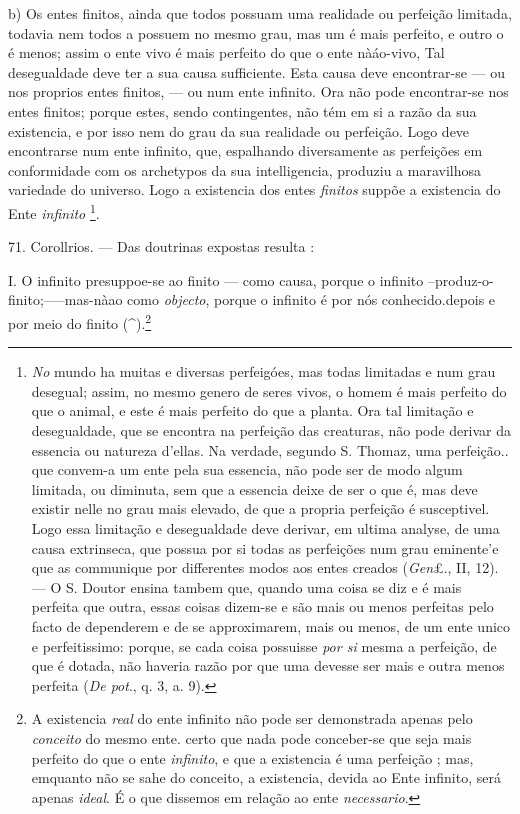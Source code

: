  b) Os entes finitos, ainda que todos possuam uma realidade ou perfeição limitada, todavia nem todos a possuem no mesmo grau, mas um é mais perfeito, e outro o é menos; assim o ente vivo é mais perfeito do que o ente nàáo-vivo, Tal desegualdade deve ter a sua causa sufficiente. Esta causa deve encontrar-se --- ou nos proprios entes finitos, --- ou num ente infinito. Ora não pode encontrar-se nos entes finitos; porque estes, sendo contingentes, não tém em si a razão da sua existencia, e por isso nem do grau da sua realidade ou perfeição. Logo deve encontrarse num ente infinito, que, espalhando diversamente as perfeições em conformidade com os archetypos da sua intelligencia, produziu a maravilhosa variedade do universo. Logo a existencia dos entes \emph{finitos} suppõe a existencia do Ente \emph{infinito} \footnote{\emph{No} mundo ha muitas e diversas perfeigóes, mas todas limitadas e num grau desegual; assim, no mesmo genero de seres vivos, o homem é mais perfeito do que o animal, e este é mais perfeito do que a planta. Ora tal limitação e desegualdade, que se encontra na perfeição das creaturas, não pode derivar da essencia ou natureza d'ellas. Na verdade, segundo S. Thomaz, uma perfeição.. que convem-a um ente pela sua essencia, não pode ser de modo algum limitada, ou diminuta, sem que a essencia deixe de ser o que é, mas deve existir nelle no grau mais elevado, de que a propria perfeição é susceptivel. Logo essa limitação e desegualdade deve derivar, em ultima analyse, de uma causa extrinseca, que possua por si todas as perfeições num grau eminente'e que as communique por differentes modos aos entes creados (\emph{Gen}£., II, 12). --- O S. Doutor ensina tambem que, quando uma coisa se diz e é mais perfeita que outra, essas coisas dizem-se e são mais ou menos perfeitas pelo facto de dependerem e de se approximarem, mais ou menos, de um ente unico e perfeitissimo: porque, se cada coisa possuisse \emph{por si} mesma a perfeição, de que é dotada, não haveria razão por que uma devesse ser mais e outra menos perfeita (\emph{De pot}., q. 3, a. 9).}.

71. Corollrios. --- Das doutrinas expostas resulta :

I. O infinito presuppoe-se ao finito --- como causa, porque o infinito --produz-o-finito;-----mas-nàao como \emph{objecto}, porque o infinito é por nós conhecido.depois e por meio do finito (\textasciicircum{}).\footnote{A existencia \emph{real} do ente infinito não pode ser demonstrada apenas pelo \emph{conceito} do mesmo ente. \textbar{} certo que nada pode conceber-se que seja mais perfeito do que o ente \emph{infinito}, e que a existencia é uma perfeição ; mas, emquanto não se sahe do conceito, a existencia, devida ao Ente infinito, será apenas \emph{ideal}. É o que dissemos em relação ao ente \emph{necessario}.}

